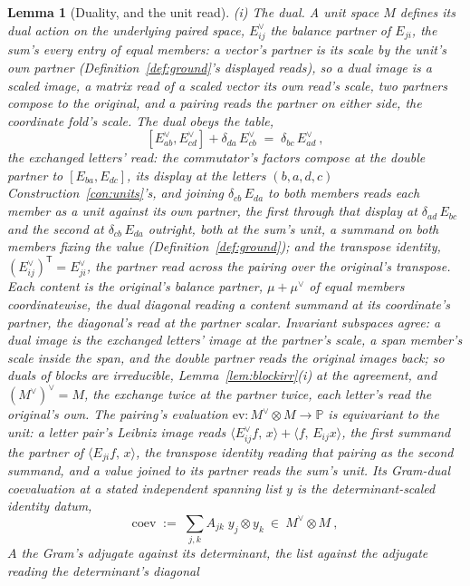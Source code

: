 \documentclass[11pt]{article}
\newtheorem{lemma}{Lemma}
\theoremstyle{definition}
\begin{document}
\begin{lemma}[Duality, and the unit read]\label{lem:dualread}
\emph{(i) The dual.} A unit space $M$ defines its \emph{dual action}
on the underlying paired space, $E^\vee_{ij}$ the balance partner of
$E_{ji}$, the sum's every entry of equal members: a vector's partner
is its scale by the unit's own partner
(Definition~\ref{def:ground}'s displayed reads), so a dual image is
a scaled image, a matrix read of a scaled vector its own read's
scale, two partners compose to the original, and a pairing reads the
partner on either side, the coordinate fold's scale. The dual obeys
the table,
\[
[E^\vee_{ab},E^\vee_{cd}]+\delta_{da}\,E^\vee_{cb}
\;=\;\delta_{bc}\,E^\vee_{ad}\ ,
\]
the exchanged letters' read: the commutator's factors compose at the
double partner to $[E_{ba},E_{dc}]$, its display at the letters
$(b,a,d,c)$ Construction~\ref{con:units}'s, and joining
$\delta_{cb}\,E_{da}$ to both members reads each member as a unit
against its own partner, the first through that display at
$\delta_{ad}\,E_{bc}$ and the second at $\delta_{cb}\,E_{da}$
outright, both at the sum's unit, a summand on both members fixing
the value (Definition~\ref{def:ground}); and the transpose identity,
$(E^\vee_{ij})^{\mathsf T}=E^\vee_{ji}$, the partner read across the
pairing over the original's transpose. Each content is the
original's balance partner, $\mu+\mu^\vee$ of equal members
coordinatewise, the dual diagonal reading a content summand at its
coordinate's partner, the diagonal's read at the partner scalar.
Invariant subspaces agree: a dual image is the exchanged letters'
image at the partner's scale, a span member's scale inside the span,
and the double partner reads the original images back; so duals of
blocks are irreducible, Lemma~\ref{lem:blockirr}(i) at the
agreement, and $(M^\vee)^\vee=M$, the exchange twice at the partner
twice, each letter's read the original's own. The pairing's
evaluation $\mathrm{ev}:M^\vee\otimes M\to\mathbb P$ is equivariant
to the unit: a letter pair's Leibniz image reads
$\langle E^\vee_{ij}f,\,x\rangle+\langle f,\,E_{ij}x\rangle$, the
first summand the partner of $\langle E_{ji}f,\,x\rangle$, the
transpose identity reading that pairing as the second summand, and a
value joined to its partner reads the sum's unit. Its
\emph{Gram-dual coevaluation} at a stated independent spanning list
$y$ is the determinant-scaled identity datum,
\[
\mathrm{coev}\;:=\;\sum_{j,k}A_{jk}\;y_j\otimes y_k
\ \in\ M^\vee\otimes M\ ,
\]
$A$ the Gram's adjugate against its determinant, the list against
the adjugate reading the determinant's diagonal

\end{lemma}
\end{document}
